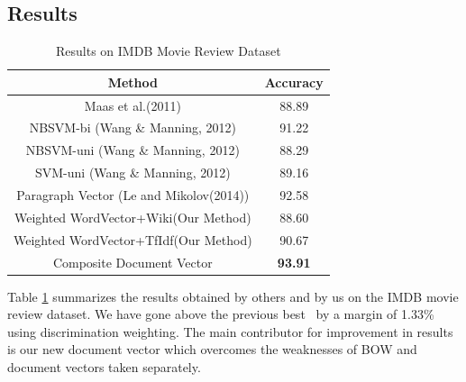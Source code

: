 \documentclass[11pt,a4paper]{article}
\begin{document}
\subsection{Results}
\label{sec:results}

\begin {table}[H]
\centering
\small
\begin{tabular}{ | c | c | }
\hline
\textbf{Method} & \textbf{Accuracy} \\ \hline
Maas et al.(2011) & 88.89\\ \hline
NBSVM-bi (Wang \& Manning, 2012) & 91.22\\ \hline
NBSVM-uni (Wang \& Manning, 2012) & 88.29\\ \hline
SVM-uni (Wang \& Manning, 2012) & 89.16\\ \hline
Paragraph Vector (Le and Mikolov(2014)) & 92.58\\ \hline
Weighted WordVector+Wiki(Our Method) & 88.60\\ \hline
Weighted WordVector+TfIdf(Our Method) & 90.67\\ \hline
Composite Document Vector & \textbf{93.91}\\ \hline

\end{tabular}
\caption {Results on IMDB Movie Review Dataset}
\label{table:IMDB}
\end{table}

Table \ref{table:IMDB} summarizes the results obtained by others and by us on the IMDB movie review dataset. We have gone above the previous best~\cite{Le:14} by a margin of 1.33\% using discrimination weighting. The main contributor for improvement in results is our new document vector which overcomes the weaknesses of BOW and document vectors taken separately.
\end{document}
